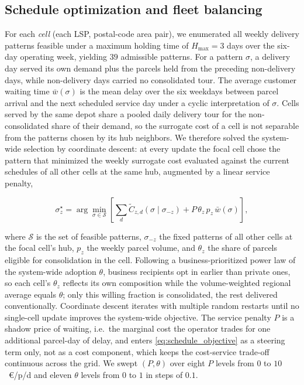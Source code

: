 \documentclass[3p,times,procedia]{elsarticle}
\begin{document}
\subsection{Schedule optimization and fleet balancing}
\label{sec:schedule_opt}

For each \emph{cell} (each LSP, postal-code area pair), we enumerated all weekly delivery patterns feasible under a maximum holding time of $H_{\max}=3$ days over the six-day operating week, yielding $39$ admissible patterns. For a pattern $\sigma$, a delivery day served its own demand plus the parcels held from the preceding non-delivery days, while non-delivery days carried no consolidated tour. The average customer waiting time $\bar{w}(\sigma)$ is the mean delay over the six weekdays between parcel arrival and the next scheduled service day under a cyclic interpretation of $\sigma$. Cells served by the same depot share a pooled daily delivery tour for the non-consolidated share of their demand, so the surrogate cost of a cell is not separable from the patterns chosen by its hub neighbors. We therefore solved the system-wide selection by coordinate descent: at every update the focal cell chose the pattern that minimized the weekly surrogate cost evaluated against the current schedules of all other cells at the same hub, augmented by a linear service penalty,

\begin{equation}
\label{eq:schedule_objective}
\sigma_z^{\star} = \arg\min_{\sigma \in \mathcal{S}} \left[ \sum_{d} \tilde{C}_{z,d}(\sigma \mid \sigma_{-z}) + P \, \theta_z \, p_z \, \bar{w}(\sigma) \right],
\end{equation}

where $\mathcal{S}$ is the set of feasible patterns, $\sigma_{-z}$ the fixed patterns of all other cells at the focal cell's hub, $p_z$ the weekly parcel volume, and $\theta_z$ the share of parcels eligible for consolidation in the cell. Following a business-prioritized power law of the system-wide adoption $\theta$, business recipients opt in earlier than private ones, so each cell's $\theta_z$ reflects its own composition while the volume-weighted regional average equals $\theta$; only this willing fraction is consolidated, the rest delivered conventionally. Coordinate descent iterates with multiple random restarts until no single-cell update improves the system-wide objective. The service penalty $P$ is a shadow price \citep{BoydVandenberghe2004} of waiting, i.e.\ the marginal cost the operator trades for one additional parcel-day of delay, and enters \eqref{eq:schedule_objective} as a steering term only, not as a cost component, which keeps the cost-service trade-off continuous across the grid. We swept $(P, \theta)$ over eight $P$ levels from $0$ to $10$~\euro/p/d and eleven $\theta$ levels from $0$ to $1$ in steps of $0.1$.
\end{document}
